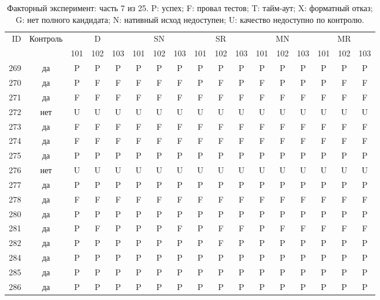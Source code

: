 \begin{table}[p]\centering\footnotesize
\setlength{\tabcolsep}{3pt}
\caption{Факторный эксперимент: часть 7 из 25. P: успех; F: провал тестов; T: тайм-аут; X: форматный отказ; G: нет полного кандидата; N: нативный исход недоступен; U: качество недоступно по контролю.}
\begin{tabular*}{\textwidth}{@{\extracolsep{\fill}}rcccccccccccccccc}\toprule
ID & Контроль & \multicolumn{3}{c}{D} & \multicolumn{3}{c}{SN} & \multicolumn{3}{c}{SR} & \multicolumn{3}{c}{MN} & \multicolumn{3}{c}{MR}\\
\cmidrule(lr){3-5}\cmidrule(lr){6-8}\cmidrule(lr){9-11}\cmidrule(lr){12-14}\cmidrule(lr){15-17}
 & & 101 & 102 & 103 & 101 & 102 & 103 & 101 & 102 & 103 & 101 & 102 & 103 & 101 & 102 & 103\\\midrule
269 & да & P & P & P & P & P & P & P & P & P & P & P & P & P & P & P\\
270 & да & P & F & F & F & F & F & P & F & P & F & P & P & P & F & F\\
271 & да & F & F & F & F & F & F & F & F & F & F & F & F & F & F & F\\
272 & нет & U & U & U & U & U & U & U & U & U & U & U & U & U & U & U\\
273 & да & F & F & F & F & F & F & F & F & F & F & F & F & F & F & F\\
274 & да & F & F & F & F & F & F & F & F & F & F & F & F & F & F & F\\
275 & да & P & P & P & P & P & P & P & P & P & P & P & P & P & P & P\\
276 & нет & U & U & U & U & U & U & U & U & U & U & U & U & U & U & U\\
277 & да & P & P & P & P & P & P & P & P & P & P & P & P & P & P & P\\
278 & да & F & F & F & F & F & F & F & F & F & F & F & F & F & F & F\\
280 & да & P & P & P & P & P & P & P & P & P & P & P & P & P & P & P\\
281 & да & P & F & P & P & P & F & P & F & F & P & F & F & F & F & F\\
282 & да & P & P & P & P & P & P & P & F & P & P & P & P & P & P & P\\
284 & да & P & P & P & P & P & P & P & P & P & P & P & P & P & P & P\\
285 & да & P & P & P & P & P & P & P & P & P & P & P & P & P & P & P\\
286 & да & P & P & P & P & P & P & P & P & P & P & P & P & P & P & P\\

\end{tabular*}
\end{table}
